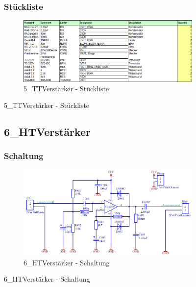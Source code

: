 \begin{figure}
	\subsubsection*{Stückliste}
	\begin{figure} [H]
		\centering
		\includegraphics[width=1\textwidth]{img/Print5/5_TTVerstaerker-Blist.png}
		\caption{5\_TTVerstärker - Stückliste}
		\label {fig:8.10.18}
	\end{figure}
\end{figure}




\begin{figure}
	\subsection{6\_HTVerstärker}
	\subsubsection*{Schaltung}
	\begin{figure} [H]
		\centering
		\includegraphics[width=1\textwidth]{img/Print6/HTVerstaerker-Schem.png}
		\caption{6\_HTVerstärker - Schaltung}
		\label {fig:8.10.19}
	\end{figure}
\end{figure}

